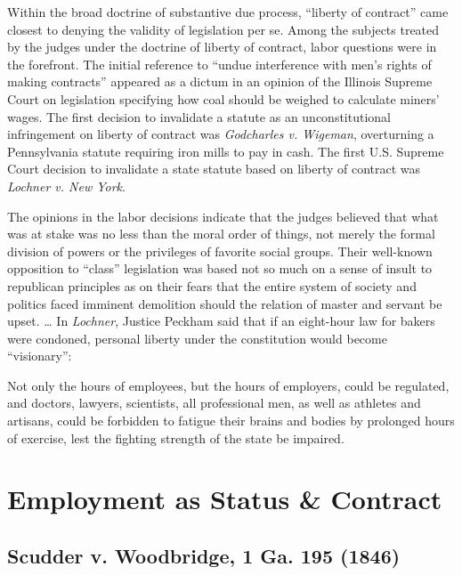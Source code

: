 \documentclass[
  letterpaper,
  11pt,
  DIV=9,
  openright]{scrbook}
\renewenvironment{quote}{
  \list{}{\leftmargin=2em\rightmargin=2em}
  \item\relax\small
}
{\endlist}
\begin{document}
Within the broad doctrine of substantive due process, ``liberty of
contract'' came closest to denying the validity of legislation per se.
Among the subjects treated by the judges under the doctrine of liberty
of contract, labor questions were in the forefront. The initial
reference to ``undue interference with men's rights of making
contracts'' appeared as a dictum in an opinion of the Illinois Supreme
Court on legislation specifying how coal should be weighed to calculate
miners' wages. The first decision to invalidate a statute as an
unconstitutional infringement on liberty of contract was
\emph{Godcharles v. Wigeman}, overturning a Pennsylvania statute
requiring iron mills to pay in cash. The first U.S. Supreme Court
decision to invalidate a state statute based on liberty of contract was
\emph{Lochner v. New York}.

The opinions in the labor decisions indicate that the judges believed
that what was at stake was no less than the moral order of things, not
merely the formal division of powers or the privileges of favorite
social groups. Their well-known opposition to ``class'' legislation was
based not so much on a sense of insult to republican principles as on
their fears that the entire system of society and politics faced
imminent demolition should the relation of master and servant be upset.
\ldots{} In \emph{Lochner}, Justice Peckham said that if an eight-hour
law for bakers were condoned, personal liberty under the constitution
would become ``visionary'':

\begin{quote}
Not only the hours of employees, but the hours of employers, could be
regulated, and doctors, lawyers, scientists, all professional men, as
well as athletes and artisans, could be forbidden to fatigue their
brains and bodies by prolonged hours of exercise, lest the fighting
strength of the state be impaired.
\end{quote}

\section{Employment as Status \&
Contract}\label{employment-as-status-contract}

\subsection{Scudder v. Woodbridge, 1 Ga. 195
(1846)}\label{scudder-v.-woodbridge-1-ga.-195-1846}
\end{document}
